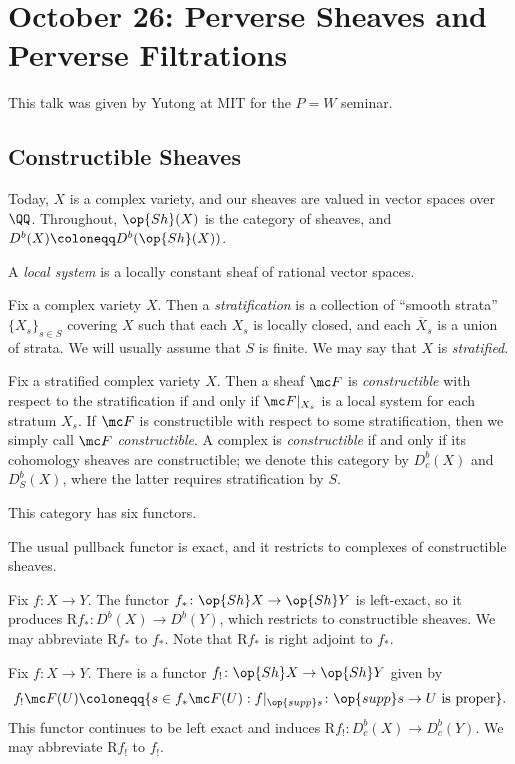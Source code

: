 \documentclass{article}
\begin{document}
\section{October 26: Perverse Sheaves and Perverse Filtrations}
This talk was given by Yutong at MIT for the $P=W$ seminar.

\subsection{Constructible Sheaves}
Today, $X$ is a complex variety, and our sheaves are valued in vector spaces over $\QQ$. Throughout, $\op{Sh}(X)$ is the category of sheaves, and $D^b(X)\coloneqq D^b(\op{Sh}(X))$.
\begin{definition}
	A \textit{local system} is a locally constant sheaf of rational vector spaces.
\end{definition}
\begin{definition}[stratification]
	Fix a complex variety $X$. Then a \textit{stratification} is a collection of ``smooth strata'' $\{X_s\}_{s\in S}$ covering $X$ such that each $X_s$ is locally closed, and each $\overline X_s$ is a union of strata. We will usually assume that $S$ is finite. We may say that $X$ is \textit{stratified}.
\end{definition}
\begin{definition}[constructible]
	Fix a stratified complex variety $X$. Then a sheaf $\mc F$ is \textit{constructible} with respect to the stratification if and only if $\mc F|_{X_s}$ is a local system for each stratum $X_s$. If $\mc F$ is constructible with respect to some stratification, then we simply call $\mc F$ \textit{constructible}. A complex is \textit{constructible} if and only if its cohomology sheaves are constructible; we denote this category by $D^b_c(X)$ and $D^b_S(X)$, where the latter requires stratification by $S$.
\end{definition}
This category has six functors.
\begin{remark}
	The usual pullback functor is exact, and it restricts to complexes of constructible sheaves.
\end{remark}
\begin{remark}
	Fix $f\colon X\to Y$. The functor $f_*\colon\op{Sh}X\to\op{Sh}Y$ is left-exact, so it produces $\mathrm Rf_*\colon D^b(X)\to D^b(Y)$, which restricts to constructible sheaves. We may abbreviate $\mathrm Rf_*$ to $f_*$. Note that $\mathrm Rf_*$ is right adjoint to $f_*$.
\end{remark}
\begin{remark}
	Fix $f\colon X\to Y$. There is a functor $f_!\colon\op{Sh}X\to\op{Sh}Y$ given by
	\[f_!\mc F(U)\coloneqq\{s\in f_*\mc F(U):f|_{\op{supp}s}\colon\op{supp}s\to U\text{ is proper}\}.\]
	This functor continues to be left exact and induces $\mathrm Rf_!\colon D_c^b(X)\to D^b_c(Y)$. We may abbreviate $\mathrm Rf_!$ to $f_!$.
\end{remark}
\end{document}
